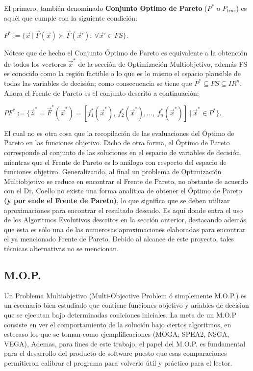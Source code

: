 \documentclass[class=report, crop=false]{standalone}
\begin{document}
El primero, también denominado \textbf{Conjunto Optimo de Pareto} 
($P^{*}$ o $P_{true}$) es aquél que cumple con la siguiente condición:\medskip\break
\centerline{$P^{*} := \{ \vec{x}\ |\ \vec{F}(\vec{x}) \succ \vec{F}(\vec{x}');\ \forall \vec{x}' \in FS \}$.}\medskip\break
Nótese que de hecho el Conjunto Óptimo de Pareto es equivalente 
a la obtención de todos los vectores $\vec{x}^{*}$ de la sección de 
Optimización Multiobjetivo, además FS es conocido como la región 
factible o lo que es lo mismo el espacio plausible de todas las 
variables de decisión; como consecuencia se tiene que $P^{*} \subseteq FS \subseteq IR^{n}$.\medskip\break
Ahora el Frente de Pareto es el conjunto descrito a continuación:\medskip\break
\centerline{$PF^{*} := \{ \vec{z}^{*} = \vec{F}^{*}(\vec{x}^{*}) = [f_1^{*}(\vec{x}^{*}),\ f_2^{*}(\vec{x}^{*}), ...,\ f_n^{*}(\vec{x}^{*})]\ |\ \vec{x}^{*} \in P^{*} \}$.}\medskip\break
El cual no es otra cosa que la recopilación de las evaluaciones 
del Óptimo de Pareto en las funciones objetivo.\break
Dicho de otra forma, el Óptimo de Pareto corresponde al conjunto 
de las soluciones en el espacio de variables de decisión, mientras 
que el Frente de Pareto es lo análogo con respecto del espacio de 
funciones objetivo.\medskip\break
Generalizando, al final un problema de Optimización Multiobjetivo 
se reduce en encontrar el Frente de Pareto, no obstante de acuerdo 
con el Dr. Coello \cite{b5} no existe una forma analítica de obtener 
el Óptimo de Pareto \textbf{(y por ende el Frente de Pareto)}, lo 
que significa que se deben utilizar aproximaciones para encontrar 
el resultado deseado.\break
Es aquí donde entra el uso de los Algoritmos Evolutivos descritos en 
la sección anterior, destacando además que esta es sólo una de las 
numerosas aproximaciones elaboradas \cite{b6} para encontrar el ya 
mencionado Frente de Pareto.\break
Debido al alcance de este proyecto, tales técnicas alternativas no 
se mencionan.

\subsection{M.O.P.}      

Un Problema Multiobjetivo (Multi-Objective Problem ó simplemente M.O.P.) es un escenario 
bien estudiado que contiene
funciones objetivo y ariables de decision que se ejecutan bajo 
determinadas coniciones iniciales.
La meta de un M.O.P consiste en ver el comportamiento de la solución 
bajo ciertos algoritmos, en estecaso
los que se toman como ejemplificaciones (MOGA; SPEA2, NSGA, VEGA),
Ademas, para fines de este trabajo, el papel del M.O.P. es fundamental 
para el desarrollo del producto de 
software puesto que esas comparaciones permitieron calibrar el programa 
para volverlo útil y práctico para el lector.
\end{document}
